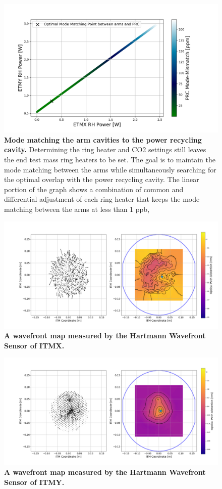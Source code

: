 \begin{figure}[ht]
\centering
\includegraphics[width=1.0 \textwidth]{../Figures/ETM_TCS_Settings.png}
\caption[Mode matching the arm cavities to the power recycling cavity.]{
	\textbf{Mode matching the arm cavities to the power recycling cavity.}  Determining the ring heater and CO2 settings still leaves the end test mass ring heaters to be set.  The goal is to maintain the mode matching between the arms while simultaneously searching for the optimal overlap with the power recycling cavity. The linear portion of the graph shows a combination of common and differential adjustment of each ring heater that keeps the mode matching between the arms at less than 1 ppb, }
\label{fig:TCS_ETM}
\end{figure}

\begin{figure}[ht]
	\centering
	\includegraphics[width=.7 \textwidth]{../Figures/ITMX_20W_abs.png}
	\caption[A wavefront map measured by the Hartmann Wavefront Sensor of ITMX.]  
	{\textbf{A wavefront map measured by the Hartmann Wavefront Sensor of ITMX.}}
	\label{fig:ITMX_WF}
\end{figure}

\begin{figure}[ht]
	\centering
	\includegraphics[width=.7 \textwidth]{../Figures/ITMY_20W_abs.png}
	\caption[A wavefront map measured by the Hartmann Wavefront Sensor of ITMY.]  
	{\textbf{A wavefront map measured by the Hartmann Wavefront Sensor of ITMY.}}
	\label{fig:ITMY_WF}
\end{figure}

